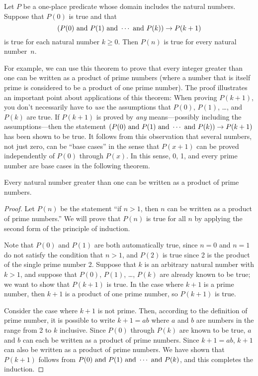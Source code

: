\begin{theorem}
Let $P$ be a one-place predicate whose domain includes
the natural numbers.  Suppose that $P(0)$ is true and that
\[(P(0)\text{ and } P(1)\text{ and }\cdots\text{ and } P(k))\rightarrow P(k+1)\]
is true for each natural number $k\geq 0$.  
Then $P(n)$ is true for every natural number~$n$.
\end{theorem}

For example, we can use this theorem to prove that every integer greater
than one can be written as a product of prime numbers (where a
number that is itself prime is considered to be a product of
one prime number).  The proof illustrates an important point about
applications of this theorem:  When proving $P(k+1)$, you don't necessarily
have to \emph{use} the assumptions that $P(0)$, $P(1)$, \dots, and $P(k)$
are true.  If $P(k+1)$ is proved by \emph{any} means---possibly including the
assumptions---then the statement $(P(0)\text{ and } P(1)\text{ and }\cdots\text{ and } P(k))\rightarrow P(k+1)$
has been shown to be true.  It follows from this observation that
several numbers, not just zero, can be ``base cases'' in
the sense that $P(x+1)$ can be proved independently of $P(0)$ through 
$P(x)$.  In this sense, 0, 1, and every prime number are base cases
in the following theorem.

\begin{theorem}
Every natural number greater than one can be written as a product of
prime numbers.
\end{theorem}
\begin{proof}
Let $P(n)$ be the statement ``if $n>1$, then $n$ can be written as a 
product of prime numbers.''  We will prove that $P(n)$ is true for all
$n$ by applying the second form of the principle of induction.

Note that $P(0)$ and $P(1)$ are both automatically true, since $n=0$ and $n=1$
do not satisfy the condition that $n>1$, and $P(2)$ is true
since 2 is the product of the single prime number 2.  Suppose that $k$ is an arbitrary
natural number with $k>1$, and suppose that $P(0)$, $P(1)$, \dots, $P(k)$
are already known to be true; we want to show that $P(k+1)$ is true.  
In the case where $k+1$ is a prime number,
then $k+1$ is a product of one prime number, so $P(k+1)$ is true.

Consider the case where $k+1$ is not prime.  Then, according to the
definition of prime number, it is possible to write $k+1=ab$ where
$a$ and $b$ are numbers in the range from 2 to $k$ inclusive.  Since
$P(0)$ through $P(k)$ are known to be true, $a$ and $b$ can
each be written as a product of prime numbers.  Since $k+1=ab$,
$k+1$ can also be written as a product of prime numbers.  We have
shown that $P(k+1)$ follows from $P(0)\text{ and } P(1)\text{ and }\cdots\text{ and } P(k)$,
and this completes the induction.
\end{proof}


